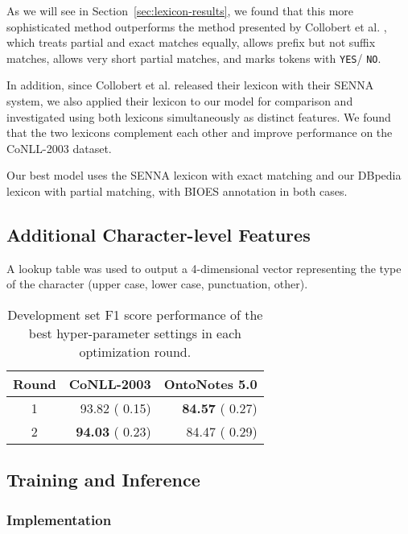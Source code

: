 \documentclass[11pt,letterpaper]{article}
\begin{document}
As we will see in Section~\ref{sec:lexicon-results}, we found that this more sophisticated method outperforms the method presented by Collobert et al. , which treats partial and exact matches equally, allows prefix but not suffix matches, allows very short partial matches, and marks tokens with {\tt YES}/{ \tt NO}.

In addition, since Collobert et al.  released their lexicon with their SENNA system, we also applied their lexicon to our model for comparison and investigated using both lexicons simultaneously as distinct features. We found that the two lexicons complement each other and improve performance on the CoNLL-2003 dataset.

Our best model uses the SENNA lexicon with exact matching and our DBpedia lexicon with partial matching, with BIOES annotation in both cases. 

\subsection{Additional Character-level Features}

\label{sec:char-types}
A lookup table was used to output a 4-dimensional vector representing the type of the character (upper case, lower case, punctuation, other).


\begin{table}[t]
\begin{center}
\small
\begin{tabular}{|c|r|r|}
\hline \bf Round & \bf CoNLL-2003 & \bf OntoNotes 5.0 \\ \hline
1 & 93.82 ( 0.15) & {\bf 84.57} ( 0.27) \\
2 & {\bf 94.03} ( 0.23) & 84.47 ( 0.29) \\
\hline
\end{tabular}
\end{center}
\caption{Development set F1 score performance of the best hyper-parameter settings in each optimization round.}
\label{tab:hyperopt-result}
\end{table}

\subsection{Training and Inference}

\subsubsection{Implementation}
\end{document}
